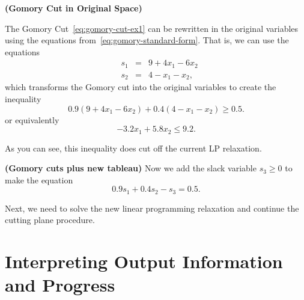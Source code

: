 \begin{example}{\textbf{(Gomory Cut in Original Space)}}{}

The Gomory Cut~\eqref{eq:gomory-cut-ex1} can be rewritten in the original variables using the equations from~\eqref{eq:gomory-standard-form}.  That is, we can use the equations
\begin{equation}
\label{eq:gomory-standard-form-equations}
\begin{array}{lrcl}
 & s_1 & = & 9 + 4x_1 - 6x_2\\
&s_2  & = & 4 - x_1 - x_2,
\end{array}
\end{equation}
which transforms the Gomory cut into the original variables to create the inequality
\begin{equation*}
\label{eq:gomory-cut-ex1-original}
0.9 (9 + 4x_1 - 6x_2) + 0.4(4 - x_1 - x_2) \geq 0.5.
\end{equation*}
or equivalently
\begin{equation}
\label{eq:gomory-cut-ex1-original}
- 3.2 x_1 + 5.8 x_2 \leq 9.2.
\end{equation}
%

As you can see, this inequality does cut off the current LP relaxation.

\end{example}


\begin{example}{\textbf{(Gomory  cuts plus new tableau)}}{}
Now we add the slack variable $s_3 \geq 0$ to make the equation
\begin{equation}
0.9 s_1 + 0.4 s_2 - s_3 = 0.5.
\end{equation}


\end{example}


Next, we need to solve the new linear programming relaxation and continue the cutting plane procedure.




\section{Interpreting Output Information and Progress}


